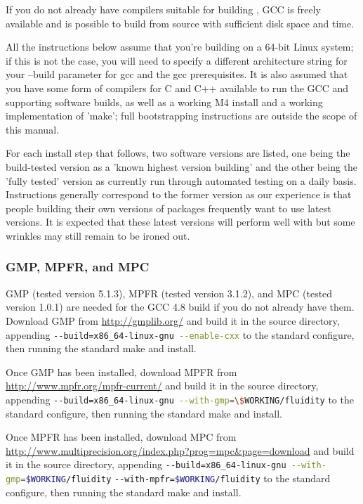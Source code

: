 If you do not already have compilers suitable for building \fluidity, GCC is
freely available and is possible to build from source with sufficient disk
space and time.

All the instructions below assume that you're building on a 64-bit Linux
system; if this is not the case, you will need to specify a different
architecture string for your --build parameter for gcc and the gcc
prerequisites. It is also assumed that you have some form of compilers for C
and C++ available to run the GCC and supporting software builds, as well as a
working M4 install and a working implementation of 'make'; full bootstrapping
instructions are outside the scope of this manual.

For each install step that follows, two software versions are listed, one being
the build-tested version as a 'known highest version building' and the other
being the 'fully tested' version as currently run through automated testing on
a daily basis. Instructions generally correspond to the former version as our
experience is that people building their own versions of packages frequently
want to use latest versions. It is expected that these latest versions will
perform well with \fluidity but some wrinkles may still remain to be ironed
out.

\subsubsection{GMP, MPFR, and MPC}
\label{sec:required_libraries_compilers_gmp_mpfr_mpc}

GMP (tested version 5.1.3), MPFR (tested version 3.1.2), and MPC (tested
version 1.0.1) are needed for the GCC 4.8 build if you do not already have
them. Download GMP from \url{http://gmplib.org/} and build it in the source
directory, appending
\lstinline[language=bash]+--build=x86_64-linux-gnu --enable-cxx+
to the standard configure, then running the standard make and
install.

Once GMP has been installed, download MPFR from
\url{http://www.mpfr.org/mpfr-current/} and build it in the source directory,
appending
\lstinline[language=bash]+--build=x86_64-linux-gnu --with-gmp=\$WORKING/fluidity+
to the standard configure, then running the
standard make and install.

Once MPFR has been installed, download MPC from
\url{http://www.multiprecision.org/index.php?prog=mpc&page=download} and build
it in the source directory, appending
\lstinline[language=bash]+--build=x86_64-linux-gnu --with-gmp=$WORKING/fluidity+
\lstinline[language=bash]+--with-mpfr=$WORKING/fluidity+
to the standard configure, then running the
standard make and install.

